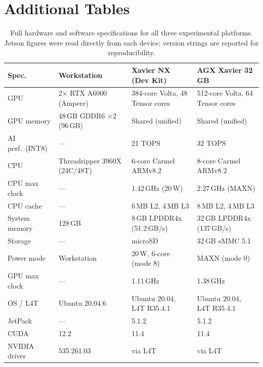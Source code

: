 \section{Additional Tables}

\begin{table}[t]
  \centering
  \small
  \caption{Full hardware and software specifications for all three
    experimental platforms. Jetson figures were read directly from each
    device; version strings are reported for reproducibility.}
  \label{tab:hardware-specs-full}
  \begin{tabular}{@{}p{}p{}p{}p{}@{}}
    \hline
    \textbf{Spec.} & \textbf{Workstation} & \textbf{Xavier NX (Dev Kit)} & \textbf{AGX Xavier 32\,GB} \\
    \hline
    GPU             & 2$\times$ RTX A6000 (Ampere) & 384-core Volta, 48 Tensor cores & 512-core Volta, 64 Tensor cores \\
    GPU memory      & 48\,GB GDDR6 $\times$2 (96\,GB) & Shared (unified)          & Shared (unified) \\
    AI perf.\ (INT8) & ---                          & 21 TOPS                   & 32 TOPS \\
    CPU             & Threadripper 3960X (24C/48T) & 6-core Carmel ARMv8.2     & 8-core Carmel ARMv8.2 \\
    CPU max clock   & ---                          & 1.42\,GHz (20\,W)         & 2.27\,GHz (MAXN) \\
    CPU cache       & ---                          & 6\,MB L2, 4\,MB L3        & 8\,MB L2, 4\,MB L3 \\
    System memory   & 128\,GB                      & 8\,GB LPDDR4x (51.2\,GB/s) & 32\,GB LPDDR4x (137\,GB/s) \\
    Storage         & ---                          & microSD                   & 32\,GB eMMC 5.1 \\
    Power mode      & Workstation                  & 20\,W, 6-core (mode 8)    & MAXN (mode 0) \\
    GPU max clock   & ---                          & 1.11\,GHz                 & 1.38\,GHz \\
    OS / L4T        & Ubuntu 20.04.6               & Ubuntu 20.04, L4T R35.4.1 & Ubuntu 20.04, L4T R35.4.1 \\
    JetPack         & ---                          & 5.1.2                     & 5.1.2 \\
    CUDA            & 12.2                         & 11.4                      & 11.4 \\
    NVIDIA driver   & 535.261.03                   & via L4T                   & via L4T \\
    \hline
  \end{tabular}
\end{table}